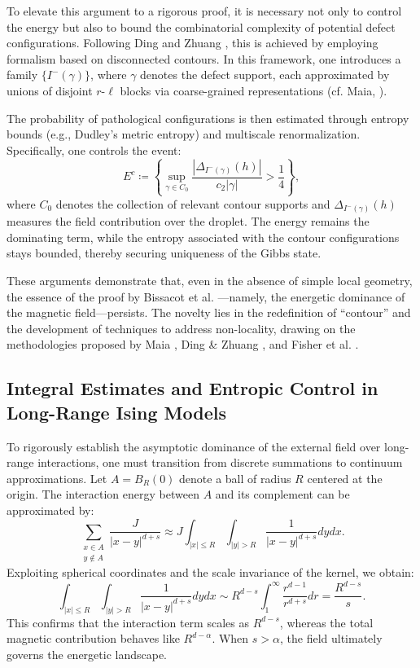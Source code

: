 \documentclass{article}
\begin{document}
To elevate this argument to a rigorous proof, it is necessary not only to control the energy but also to bound the combinatorial complexity of potential defect configurations. Following Ding and Zhuang \cite{ding2024}, this is achieved by employing formalism based on disconnected contours. In this framework, one introduces a family $\{I^-(\gamma)\}$, where $\gamma$ denotes the defect support, each approximated by unions of disjoint $r$-$\ell$ blocks via coarse-grained representations (cf. Maia, \cite{maia2024}).

The probability of pathological configurations is then estimated through entropy bounds (e.g., Dudley's metric entropy) and multiscale renormalization. Specifically, one controls the event:
\[
E^c \coloneqq \left\{\sup_{\gamma\in C_0} \frac{|\Delta_{I^-(\gamma)}(h)|}{c_2|\gamma|} > \frac{1}{4}\right\},
\]
where $C_0$ denotes the collection of relevant contour supports and $\Delta_{I^-(\gamma)}(h)$ measures the field contribution over the droplet. The energy remains the dominating term, while the entropy associated with the contour configurations stays bounded, thereby securing uniqueness of the Gibbs state.

These arguments demonstrate that, even in the absence of simple local geometry, the essence of the proof by Bissacot et al. \cite{bissacot2015}---namely, the energetic dominance of the magnetic field---persists. The novelty lies in the redefinition of ``contour'' and the development of techniques to address non-locality, drawing on the methodologies proposed by Maia \cite{maia2024}, Ding \& Zhuang \cite{ding2024}, and Fisher et al. \cite{fisher1984}.

\subsection{Integral Estimates and Entropic Control in Long-Range Ising Models}
\hypertarget{pag7}{}
To rigorously establish the asymptotic dominance of the external field over long-range interactions, one must transition from discrete summations to continuum approximations. Let $A = B_R(0)$ denote a ball of radius $R$ centered at the origin. The interaction energy between $A$ and its complement can be approximated by:
\[
\sum_{\substack{x\in A\\ y\notin A}} \frac{J}{|x-y|^{d+s}} \approx J \int_{|x|\leq R} \int_{|y|>R} \frac{1}{|x-y|^{d+s}} dydx.
\]
Exploiting spherical coordinates and the scale invariance of the kernel, we obtain:
\[
\int_{|x|\leq R} \int_{|y|>R} \frac{1}{|x-y|^{d+s}} dydx \sim R^{d-s} \int_1^\infty \frac{r^{d-1}}{r^{d+s}} dr = \frac{R^{d-s}}{s}.
\]
This confirms that the interaction term scales as $R^{d-s}$, whereas the total magnetic contribution behaves like $R^{d-\alpha}$. When $s>\alpha$, the field ultimately governs the energetic landscape.
\end{document}
